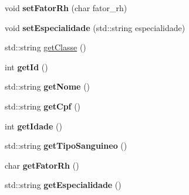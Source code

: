 \begin{DoxyCompactItemize}
\item 
\mbox{\label{classFuncionario_a37190bf1412027f171086f95fa410c2f}} 
void {\bfseries set\+Fator\+Rh} (char fator\+\_\+rh)
\item 
\mbox{\label{classFuncionario_ae412312aaaaceaca6dd132e8397b283f}} 
void {\bfseries set\+Especialidade} (std\+::string especialidade)
\item 
std\+::string \hyperlink{classFuncionario_aedbde8ce3c50377656b3559793b6a182}{get\+Classe} ()
\item 
\mbox{\label{classFuncionario_a0288286a907e587b7ab75d6c23354a06}} 
int {\bfseries get\+Id} ()
\item 
\mbox{\label{classFuncionario_a35376709ae5c7357e79ca612a74e7f15}} 
std\+::string {\bfseries get\+Nome} ()
\item 
\mbox{\label{classFuncionario_aad99a1c5373c00bf5ad161aad1b18a4f}} 
std\+::string {\bfseries get\+Cpf} ()
\item 
\mbox{\label{classFuncionario_a56c0e639b32092699be9a9be347de45c}} 
int {\bfseries get\+Idade} ()
\item 
\mbox{\label{classFuncionario_a871dfd5403d3d3c026c35b62ee2bb6a9}} 
std\+::string {\bfseries get\+Tipo\+Sanguineo} ()
\item 
\mbox{\label{classFuncionario_a87dc4304683c4a4492a5ecd516d29f44}} 
char {\bfseries get\+Fator\+Rh} ()
\item 
\mbox{\label{classFuncionario_a98b261893ff916049db28530d3ba1160}} 
std\+::string {\bfseries get\+Especialidade} ()
\end{DoxyCompactItemize}
